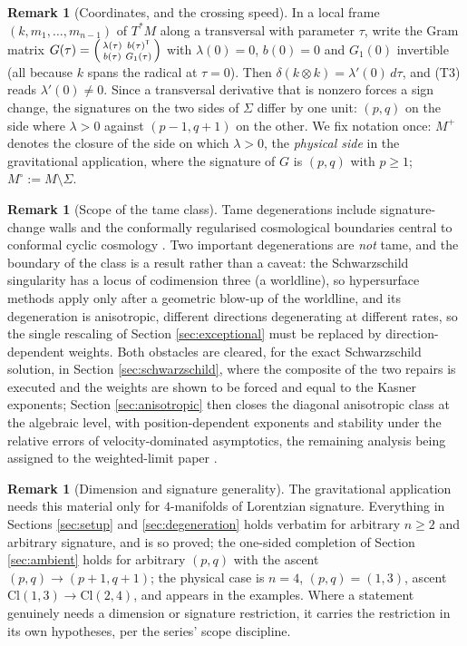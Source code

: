 \documentclass[11pt]{article}
\theoremstyle{definition}
\newtheorem{remark}[theorem]{Remark}
\newcommand{\Cl}{\mathrm{Cl}}
\newcommand{\Sig}{\Sigma}
\newcommand{\Mo}{M^{\circ}}
\newcommand{\Mp}{M^{+}}
\begin{document}
\begin{remark}[Coordinates, and the crossing speed]\label{rem:coords}
In a local frame $(k, m_1, \dots, m_{n-1})$ of $T^*M$ along a transversal with parameter $\tau$, write the Gram matrix $G(\tau) = \begin{psmallmatrix} \lambda(\tau) & b(\tau)^{\mathsf T} \\ b(\tau) & G_1(\tau)\end{psmallmatrix}$ with $\lambda(0) = 0$, $b(0) = 0$ and $G_1(0)$ invertible (all because $k$ spans the radical at $\tau = 0$). Then $\delta(k \otimes k) = \lambda'(0)\, d\tau$, and (T3) reads $\lambda'(0) \neq 0$. Since a transversal derivative that is nonzero forces a sign change, the signatures on the two sides of $\Sig$ differ by one unit: $(p,q)$ on the side where $\lambda > 0$ against $(p{-}1, q{+}1)$ on the other. We fix notation once: $\Mp$ denotes the closure of the side on which $\lambda > 0$, the \emph{physical side} in the gravitational application, where the signature of $G$ is $(p, q)$ with $p \geq 1$; $\Mo := M \setminus \Sig$.
\end{remark}

\begin{remark}[Scope of the tame class]\label{rem:tamescope}
Tame degenerations include signature-change walls and the conformally regularised cosmological boundaries central to conformal cyclic cosmology \cite{Penrose2010}. Two important degenerations are \emph{not} tame, and the boundary of the class is a result rather than a caveat: the Schwarzschild singularity has a locus of codimension three (a worldline), so hypersurface methods apply only after a geometric blow-up of the worldline, and its degeneration is anisotropic, different directions degenerating at different rates, so the single rescaling of Section \ref{sec:exceptional} must be replaced by direction-dependent weights. Both obstacles are cleared, for the exact Schwarzschild solution, in Section \ref{sec:schwarzschild}, where the composite of the two repairs is executed and the weights are shown to be forced and equal to the Kasner exponents; Section \ref{sec:anisotropic} then closes the diagonal anisotropic class at the algebraic level, with position-dependent exponents and stability under the relative errors of velocity-dominated asymptotics, the remaining analysis being assigned to the weighted-limit paper \cite{ButlerT6}.
\end{remark}

\begin{remark}[Dimension and signature generality]\label{rem:generality}
The gravitational application needs this material only for $4$-manifolds of Lorentzian signature. Everything in Sections \ref{sec:setup} and \ref{sec:degeneration} holds verbatim for arbitrary $n \geq 2$ and arbitrary signature, and is so proved; the one-sided completion of Section \ref{sec:ambient} holds for arbitrary $(p,q)$ with the ascent $(p,q) \to (p{+}1,q{+}1)$; the physical case is $n = 4$, $(p,q) = (1,3)$, ascent $\Cl(1,3) \to \Cl(2,4)$, and appears in the examples. Where a statement genuinely needs a dimension or signature restriction, it carries the restriction in its own hypotheses, per the series' scope discipline.
\end{remark}
\end{document}
